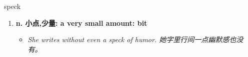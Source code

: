 
\begin{frame}
{\huge speck}
\begin{center}
\begin{enumerate}\Large
  \item \textbf{n. 小点,少量: a very small amount: bit}
  \begin{itemize}
    \item \em{\Large{She writes without even a speck of humor. 她字里行间一点幽默感也没有。}}
  \end{itemize}
\end{enumerate}
\end{center}
\end{frame}
